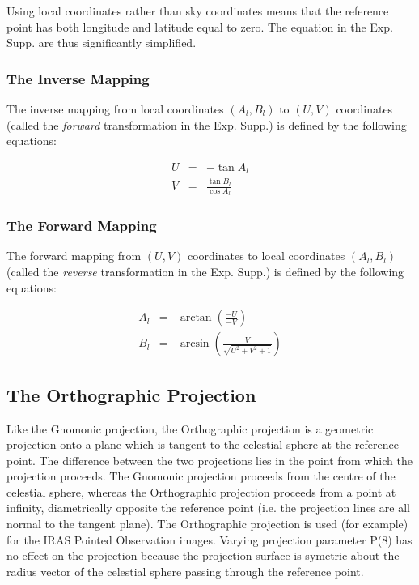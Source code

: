 Using local coordinates rather than sky coordinates means that the reference
point has both longitude and latitude equal to zero. The equation in the Exp.
Supp. are thus significantly simplified.

\subsubsection {The Inverse Mapping}
The inverse mapping from local coordinates $(A_{l},B_{l})$ to $(U,V)$
coordinates (called the {\em forward} transformation in the Exp. Supp.) is
defined by the following equations:

\begin{eqnarray*}
U & = & -\tan A_{l}\\
V & = & \frac{\tan B_{l}}{\cos A_{l}}
\end{eqnarray*}

\subsubsection {The Forward Mapping}
The forward mapping from $(U,V)$ coordinates to local coordinates
$(A_{l},B_{l})$ (called the {\em reverse} transformation in the Exp. Supp.) is
defined by the following equations:

\begin{eqnarray*}
A_{l} & = & \arctan \left( \frac{-U}{-V} \right)\\
B_{l} & = & \arcsin \left(\frac{V}{\sqrt{U^{2}+V^{2}+1}} \right)
\end{eqnarray*}

\subsection {The Orthographic Projection}
Like the Gnomonic projection, the Orthographic projection is a geometric
projection onto a plane which is tangent to the celestial sphere at the
reference point. The difference between the two projections lies in the point
from which the projection proceeds. The Gnomonic projection proceeds from the
centre of the celestial sphere, whereas the Orthographic projection proceeds
from a point at infinity, diametrically opposite the reference point (i.e. the
projection lines are all normal to the tangent plane). The Orthographic
projection is used (for example) for the IRAS Pointed Observation images.
Varying projection parameter P(8) has no effect on the projection because the
projection surface is symetric about the radius vector of the celestial sphere
passing through the reference point.

